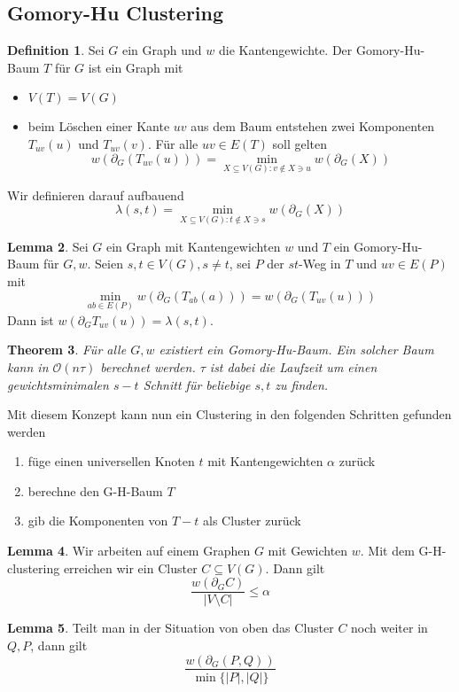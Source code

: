 \documentclass[a4paper, 12pt]{article}
\theoremstyle{plain}
\newtheorem{theorem}{Theorem}[subsection] %
\theoremstyle{definition}
\newtheorem{definition}[theorem]{Definition} %
\theoremstyle{lemma}
\newtheorem{lemma}[theorem]{Lemma}
\theoremstyle{remark}
\theoremstyle{corollary}
\theoremstyle{example}
\begin{document}
	\subsection{Gomory-Hu Clustering}
	\begin{definition}
		Sei $G$ ein Graph und $w$ die Kantengewichte. Der Gomory-Hu-Baum $T$ für $G$ ist ein Graph mit \begin{itemize}
			\item $V(T) = V(G)$
			\item beim Löschen einer Kante $uv$ aus dem Baum entstehen zwei Komponenten $T_{uv}(u)$ und $T_{uv}(v)$. Für alle $uv \in E(T)$ soll gelten \[w(\partial_G(T_{uv}(u))) = \min_{X\subseteq V(G): v\notin X \ni u} w(\partial_G(X))\] 
		\end{itemize}
		Wir definieren darauf aufbauend \[\lambda(s,t) = \min_{X\subseteq V(G): t \notin X \ni s} w(\partial_G(X))\]
	\end{definition}
	\begin{lemma}
		Sei $G$ ein Graph mit Kantengewichten $w$ und $T$ ein Gomory-Hu-Baum für $G,w$. Seien $s,t \in V(G), s\neq t$, sei $P$ der $st$-Weg in $T$ und $uv \in E(P)$ mit \[\min_{ab \in E(P)} w(\partial_G(T_{ab}(a))) = w(\partial_G(T_{uv}(u)))\] Dann ist $w(\partial_GT_{uv}(u)) = \lambda(s,t)$.
	\end{lemma}
	\begin{theorem}
		Für alle $G,w$ existiert ein Gomory-Hu-Baum. Ein solcher Baum kann in $\mathcal{O}(n\tau)$ berechnet werden. $\tau$ ist dabei die Laufzeit um einen gewichtsminimalen $s-t$ Schnitt für beliebige $s,t$ zu finden.
	\end{theorem}
	Mit diesem Konzept kann nun ein Clustering in den folgenden Schritten gefunden werden \begin{enumerate}
		\item füge einen universellen Knoten $t$ mit Kantengewichten $\alpha$ zurück
		\item berechne den G-H-Baum $T$
		\item gib die Komponenten von $T-t$ als Cluster zurück
	\end{enumerate}
	\begin{lemma}
		Wir arbeiten auf einem Graphen $G$ mit Gewichten $w$. Mit dem G-H-clustering erreichen wir ein Cluster $C \subseteq V(G)$. Dann gilt \[\frac{w(\partial_GC)}{\left|V\setminus C\right|} \leq \alpha\]
	\end{lemma}
	\begin{lemma}
		Teilt man in der Situation von oben das Cluster $C$ noch weiter in $Q,P$, dann gilt \[\frac{w(\partial_G(P,Q))}{\min\{\left|P\right|,\left|Q\right|\}}\]
	\end{lemma}
\end{document}
